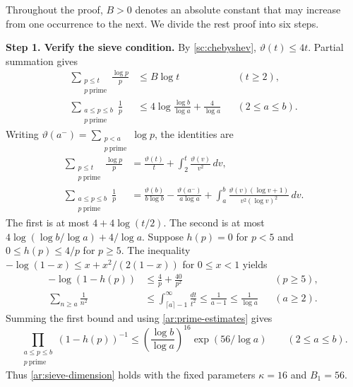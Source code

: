 \documentclass[twoside]{aomart}
\makeatletter
\theoremstyle{paperplain}
\theoremstyle{paperdefinition}
\renewenvironment{proof}[1][\proofname]{\par\pushQED{\qed}%
  \normalfont\topsep6\p@\@plus3\p@\relax\trivlist
  \item[\hskip\labelsep\itshape #1\@addpunct{.}]\ignorespaces
}{\popQED\endtrivlist\@endpefalse}
\numberwithin{equation}{section}
\makeatother
\begin{document}
\begin{proof}
Throughout the proof, $B>0$ denotes an absolute constant
that may increase from one occurrence to the next. We divide the rest proof into six steps.

\par
\medskip
\noindent\textbf{Step 1. Verify the sieve condition.}
By \eqref{sc:chebyshev}, $\vartheta(t)\le4t$. Partial summation gives
\begin{equation}
 \begin{aligned}
 \sum_{\substack{p\le t\\p\ \mathrm{prime}}}\frac{\log p}{p}&\le B\log t &&(t\ge2),\\
 \sum_{\substack{a\le p\le b\\p\ \mathrm{prime}}}\frac1p
 &\le4\log\frac{\log b}{\log a}+\frac4{\log a}
 &&(2\le a\le b).
 \end{aligned}
 \label{ar:prime-estimates}
\end{equation}
Writing $\displaystyle\vartheta(a^-)=\sum_{\substack{p<a\\p\ \mathrm{prime}}}\log p$, the identities are
\begin{equation*}
 \begin{aligned}
 \sum_{\substack{p\le t\\p\ \mathrm{prime}}}\frac{\log p}{p}
 &=\frac{\vartheta(t)}t+\int_2^t\frac{\vartheta(v)}{v^2}\,dv,\\
 \sum_{\substack{a\le p\le b\\p\ \mathrm{prime}}}\frac1p
 &=\frac{\vartheta(b)}{b\log b}
   -\frac{\vartheta(a^-)}{a\log a}
   +\int_a^b\frac{\vartheta(v)(\log v+1)}{v^2(\log v)^2}\,dv.
 \end{aligned}
 \end{equation*}
The first is at most $4+4\log(t/2)$. The second is at most
$4\log(\log b/\log a)+4/\log a$.
Suppose $h(p)=0$ for $p<5$ and $0\le h(p)\le4/p$ for $p\ge5$.
The inequality $-\log(1-x)\le x+x^2/(2(1-x))$ for $0\le x<1$ yields
\begin{equation*}
 \begin{aligned}
 -\log(1-h(p))&\le\frac4p+\frac{40}{p^2} &&(p\ge5),\\
 \sum_{n\ge a}\frac1{n^2}
 &\le\int_{\lceil a\rceil-1}^{\infty}\frac{dt}{t^2}
 \le\frac1{a-1}\le\frac1{\log a} &&(a\ge2).
 \end{aligned}
\end{equation*}
Summing the first bound and using \eqref{ar:prime-estimates} gives
\begin{equation*}
 \prod_{\substack{a\le p\le b\\p\ \mathrm{prime}}}(1-h(p))^{-1}
 \le\left(\frac{\log b}{\log a}\right)^{16}
       \exp(56/\log a)\qquad(2\le a\le b).
 \end{equation*}
Thus \eqref{ar:sieve-dimension} holds with the fixed parameters
$\kappa=16$ and $B_1=56$.


\end{proof}
\end{document}
